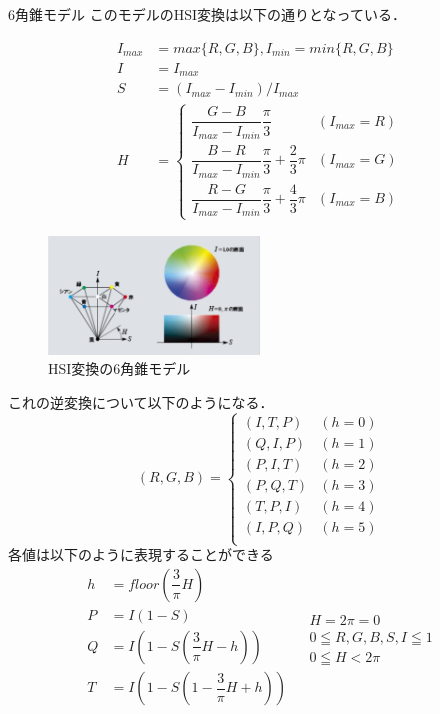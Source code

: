 \documentclass[8pt, jfont=ipaexm, t]{beamer} %
\begin{document}
\begin{frame}[allowframebreaks]{6角錐モデル}
このモデルのHSI変換は以下の通りとなっている．

\begin{equation}
\begin{aligned}
I_{max} &= max\{R, G, B\}, I_{min} = min\{R, G, B\} \\
I &= I_{max} \\
S &= (I_{max} - I_{min}) / I_{max} \\
H &= 
\begin{cases}
\dfrac{G - B}{I_{max} - I_{min}}\dfrac{\pi}{3} & (I_{max} = R) \\[3mm]
\dfrac{B - R}{I_{max} - I_{min}}\dfrac{\pi}{3} + \dfrac{2}{3}\pi & (I_{max} = G) \\[3mm]
\dfrac{R - G}{I_{max} - I_{min}}\dfrac{\pi}{3} + \dfrac{4}{3}\pi & (I_{max} = B)
\end{cases}
\end{aligned}
\end{equation}
\newpage
\begin{figure}[b]
  \centering
  \includegraphics[width=0.5\textwidth]{./figure/026.png}
  \caption{HSI変換の6角錐モデル}
  \label{fig:hsi}
\end{figure}

\newpage

これの逆変換について以下のようになる．
\begin{equation}
 (R,G,B) =
\begin{cases}
(I, T, P) & (h = 0) \\
(Q, I, P) & (h = 1) \\
(P, I, T) & (h = 2) \\
(P, Q, T) & (h = 3) \\
(T, P, I) & (h = 4) \\
(I, P, Q) & (h = 5) \\
\end{cases}
\end{equation}
各値は以下のように表現することができる
\begin{equation}
\begin{aligned}
h &= floor(\dfrac{3}{\pi}H) \\
P &= I(1 - S) \\
Q &= I(1 - S(\dfrac{3}{\pi}H - h)) \\
T &= I(1  - S(1 - \dfrac{3}{\pi} H + h)) \\
\end{aligned}
\begin{aligned}
&H = 2\pi = 0 \\
&0 \leqq R, G, B, S, I \leqq 1 \\
&0 \leqq H < 2\pi
\end{aligned}
\end{equation}
\end{frame}
\end{document}
